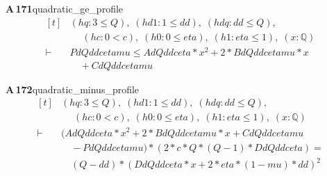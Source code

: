 \documentclass[conference]{IEEEtran}
\theoremstyle{definition}
\newcommand{\lean}[1]{\textsf{\footnotesize #1}}
\begin{document}
\noindent\textbf{A\,171}\quad\lean{quadratic\_ge\_profile}
{\footnotesize\[ \begin{aligned}[t]
&(\mathit{hq} : 3 \leq \mathit{Q}),\; (\mathit{hd1} : 1 \leq \mathit{dd}),\; (\mathit{hdq} : \mathit{dd} \leq \mathit{Q}),\\
&\quad \; (\mathit{hc} : 0 < \mathit{c}),\; (\mathit{h0} : 0 \leq \mathit{eta}),\; (\mathit{h1} : \mathit{eta} \leq 1),\; (\mathit{x} : \mathbb{Q} )\\
\vdash\;&\mathit{Pd} \mathit{Q} \mathit{dd} \mathit{c} \mathit{eta} \mathit{mu} \leq \mathit{Ad} \mathit{Q} \mathit{dd} \mathit{c} \mathit{eta} * \mathit{x} ^{2} + 2 * \mathit{Bd} \mathit{Q} \mathit{dd} \mathit{c} \mathit{eta} \mathit{mu} * \mathit{x}\\
&\quad + \mathit{Cd} \mathit{Q} \mathit{dd} \mathit{c} \mathit{eta} \mathit{mu}
\end{aligned} \]}

\noindent\textbf{A\,172}\quad\lean{quadratic\_minus\_profile}
{\footnotesize\[ \begin{aligned}[t]
&(\mathit{hq} : 3 \leq \mathit{Q}),\; (\mathit{hd1} : 1 \leq \mathit{dd}),\; (\mathit{hdq} : \mathit{dd} \leq \mathit{Q}),\\
&\quad \; (\mathit{hc} : 0 < \mathit{c}),\; (\mathit{h0} : 0 \leq \mathit{eta}),\; (\mathit{h1} : \mathit{eta} \leq 1),\; (\mathit{x} : \mathbb{Q} )\\
\vdash\;&(\mathit{Ad} \mathit{Q} \mathit{dd} \mathit{c} \mathit{eta} * \mathit{x} ^{2} + 2 * \mathit{Bd} \mathit{Q} \mathit{dd} \mathit{c} \mathit{eta} \mathit{mu} * \mathit{x} + \mathit{Cd} \mathit{Q} \mathit{dd} \mathit{c} \mathit{eta} \mathit{mu}\\
&\quad - \mathit{Pd} \mathit{Q} \mathit{dd} \mathit{c} \mathit{eta} \mathit{mu}) * (2 * \mathit{c} * \mathit{Q} * (\mathit{Q} - 1) * \mathit{Dd} \mathit{Q} \mathit{dd} \mathit{c} \mathit{eta}) =\\
&\quad (\mathit{Q} - \mathit{dd}) * (\mathit{Dd} \mathit{Q} \mathit{dd} \mathit{c} \mathit{eta} * \mathit{x} + 2 * \mathit{eta} * (1 - \mathit{mu}) * \mathit{dd}) ^{2}
\end{aligned} \]}
\end{document}
